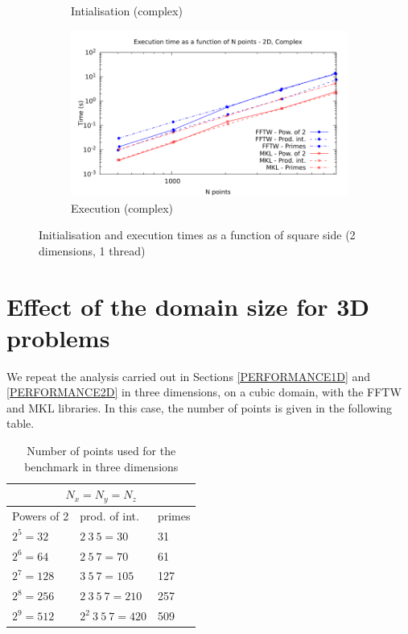 \documentclass[12pt, a4paper]{article}
\begin{document}
\begin{figure}[H]
\begin{subfigure}{.5\textwidth}
\caption{Intialisation (complex)}
\label{2DCI}
\end{subfigure}%
\begin{subfigure}{.5\textwidth}
\centering
\includegraphics[width=.9\linewidth]{graphs/2d-exec-c.pdf}
\caption{Execution (complex)}
\label{2DC}
\end{subfigure}
\caption{Initialisation and execution times as a function of square side (2 dimensions, 1 thread)}
\label{2D}
\end{figure}

\section{Effect of the domain size for 3D problems}\label{PERFORMANCE3D}

We repeat the analysis carried out in Sections \ref{PERFORMANCE1D} and \ref{PERFORMANCE2D} in three dimensions, on a cubic domain, with  the FFTW and MKL libraries. In this case, the number of points is given in the following table.\\

\begin{table}[H]
\centering
\begin{tabular}{|l|l|l|}
  \hline
  \multicolumn{3}{|c|}{$N_x=N_y=N_z$}\\
  \hline
  \hline
  Powers of 2 & prod. of int. & primes\\ \hline
$2^5=32$ & $2\ 3\ 5=30$	& 31\\ \hline
$2^6=64$ & $2\ 5\ 7=70$	& 61\\ \hline
$2^7=128$ & $3\ 5\ 7=105$ & 127\\ \hline
$2^8=256$ & $2\ 3\ 5\ 7=210$ & 257\\ \hline
$2^9=512$ & $2^2\ 3\ 5\ 7=420$ & 509\\ \hline
\end{tabular}
\caption{Number of points used for the benchmark in three dimensions}
\end{table}
\end{document}
